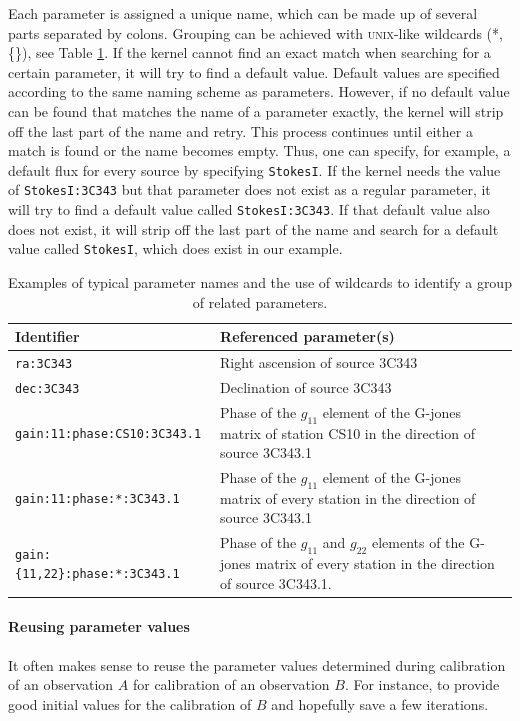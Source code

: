 \documentclass[10pt]{lofar}
\begin{document}
Each parameter is assigned a unique name, which can be made up of several parts
separated by colons. Grouping can be achieved with \textsc{unix}-like wildcards
(*, \{\}), see Table \ref{tab:naming_scheme}. If the kernel cannot find an
exact match when searching for a certain parameter, it will try to find a
default value. Default values are specified according to the same naming scheme
as parameters. However, if no default value can be found that matches the name
of a parameter exactly, the kernel will strip off the last part of the name and
retry. This process continues until either a match is found or the name becomes
empty. Thus, one can specify, for example, a default flux for every source by
specifying \texttt{StokesI}. If the kernel needs the value of
\texttt{StokesI:3C343} but that parameter does not exist as a regular parameter,
it will try to find a default value called \texttt{StokesI:3C343}. If that
default value also does not exist, it will strip off the last part of the name
and search for a default value called \texttt{StokesI}, which does exist in our
example.

\begin{table}[htb!]
\centering
\begin{tabular}{lp{}}
\hline
\textbf{Identifier} & \textbf{Referenced parameter(s)} \\
\hline
\texttt{ra:3C343} & Right ascension of source 3C343 \\
\hline
\texttt{dec:3C343} & Declination of source 3C343 \\
\hline
\texttt{gain:11:phase:CS10:3C343.1} & Phase of the $g_{11}$ element of the
G-jones matrix of station CS10 in the direction of source 3C343.1 \\
\hline
\texttt{gain:11:phase:*:3C343.1} & Phase of the $g_{11}$ element of the G-jones
matrix of every station in the direction of source 3C343.1 \\
\hline
\texttt{gain:\{11,22\}:phase:*:3C343.1} & Phase of the $g_{11}$ and $g_{22}$
elements of the G-jones matrix of every station in the direction of source 3C343.1. \\
\hline
\end{tabular}
\caption{Examples of typical parameter names and the use of wildcards to
identify a group of related parameters.}
\label{tab:naming_scheme}
\end{table}

\paragraph{Reusing parameter values}
It often makes sense to reuse the parameter values determined during
calibration of an observation $A$ for calibration of an observation $B$. For
instance, to provide good initial values for the calibration of $B$ and
hopefully save a few iterations.
\end{document}
